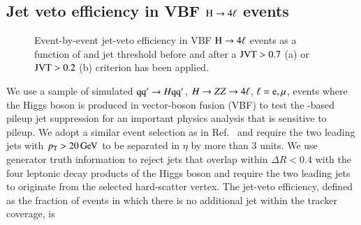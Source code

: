 \documentclass{atlasnote}
\begin{document}
\subsection{Jet veto efficiency in VBF ${\rm H} \to 4\ell$ events}
\begin{figure}[!htbp]
 \centering
 \caption{Event-by-event jet-veto efficiency in VBF ${\rm H} \to 4\ell$ events as a function of \NPV and jet \pT threshold before and after a $\JVT>0.7$ (a) or $\JVT>0.2$ (b) criterion has been applied.}
 \label{fig:VBF_Higgs}
\end{figure}
We use a sample of simulated $\pq \pq^{\prime} \to \Higgs \pq \pq^{\prime}$, $\Higgs \to \Zboson\Zboson \to 4 \ell$, $\ell = {\rm e},\mu$, events where the Higgs boson \Higgs is produced in vector-boson fusion (VBF)
to test the \JVT-based pileup jet suppression for an important physics analysis
that is sensitive to pileup. We adopt a similar event selection as in Ref.~\cite{ATLAS-CONF-2013-013} 
and require the two leading jets with $\pT > 20 \GeV$ to be separated in $\eta$ by more than 3 units. We use generator truth information to reject jets that overlap
within $\Delta R<0.4$ with the four leptonic decay products of the Higgs boson and require the two leading jets to originate from the selected hard-scatter vertex.
The jet-veto efficiency, defined as the fraction of events in which there is no additional jet within the tracker coverage, is
\end{document}

